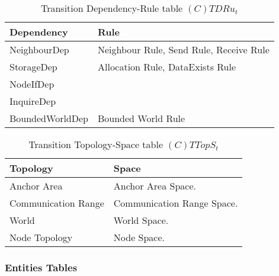 \begin{table}[H]
	\centering
	\begin{tabular}{|p{4cm}|p{8cm}|}
			\hline
			\textbf{Dependency} & \textbf{Rule} \\
			\hline
			NeighbourDep & Neighbour Rule, Send Rule, Receive Rule\\
			\hline
			StorageDep & Allocation Rule, DataExists Rule \\
			\hline
			NodeIfDep & \\
			\hline
			InquireDep & \\
			\hline
			BoundedWorldDep & Bounded World Rule\\
			\hline
		\end{tabular}
	\caption{Transition Dependency-Rule table $(C)TDRu_t$}
	\label{tab:ctdrut}
\end{table}

\begin{table}[H]
	\centering
	\begin{tabular}{|p{4cm}|p{8cm}|}
			\hline
			\textbf{Topology} & \textbf{Space} \\
			\hline
			Anchor Area & Anchor Area Space.\\
			\hline
			Communication Range & Communication Range Space. \\
			\hline
			World & World Space. \\
			\hline
			Node Topology & Node Space. \\
			\hline
		\end{tabular}
	\caption{Transition Topology-Space table $(C)TTopS_t$}
	\label{tab:cttopst}
\end{table}

\subsubsection{Entities Tables}

